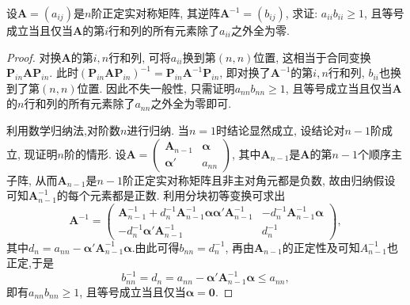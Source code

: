 \documentclass[../../main.tex]{subfiles}
\begin{document}
\begin{example}
设$\boldsymbol{A}=(a_{ij})$是$n$阶正定实对称矩阵, 其逆阵$\boldsymbol{A}^{-1}=(b_{ij})$, 求证: $a_{ii}b_{ii}\geqslant  1$, 且等号成立当且仅当$\boldsymbol{A}$的第$i$行和列的所有元素除了$a_{ii}$之外全为零.
\end{example}
\begin{proof}
对换$\boldsymbol{A}$的第$i,n$行和列, 可将$a_{ii}$换到第$(n,n)$位置, 这相当于合同变换$\boldsymbol{P}_{in}\boldsymbol{A}\boldsymbol{P}_{in}$. 此时$(\boldsymbol{P}_{in}\boldsymbol{A}\boldsymbol{P}_{in})^{-1}=\boldsymbol{P}_{in}\boldsymbol{A}^{-1}\boldsymbol{P}_{in}$, 即对换了$\boldsymbol{A}^{-1}$的第$i,n$行和列, $b_{ii}$也换到了第$(n,n)$位置. 因此不失一般性, 只需证明$a_{nn}b_{nn}\geqslant  1$, 且等号成立当且仅当$\boldsymbol{A}$的$n$行和列的所有元素除了$a_{nn}$之外全为零即可. 

利用数学归纳法,对阶数$n$进行归纳. 当$n = 1$时结论显然成立, 设结论对$n - 1$阶成立, 现证明$n$阶的情形. 设$\boldsymbol{A}=\begin{pmatrix}
\boldsymbol{A}_{n - 1} & \boldsymbol{\alpha} \\
\boldsymbol{\alpha}' & a_{nn}
\end{pmatrix}$, 其中$\boldsymbol{A}_{n - 1}$是$\boldsymbol{A}$的第$n - 1$个顺序主子阵, 从而$\boldsymbol{A}_{n - 1}$是$n - 1$阶正定实对称矩阵且非主对角元都是负数, 故由归纳假设可知$\boldsymbol{A}_{n - 1}^{-1}$的每个元素都是正数. 利用分块初等变换可求出
\[
\boldsymbol{A}^{-1}=\begin{pmatrix}
\boldsymbol{A}_{n - 1}^{-1}+d_n^{-1}\boldsymbol{A}_{n - 1}^{-1}\boldsymbol{\alpha}\boldsymbol{\alpha}'\boldsymbol{A}_{n - 1}^{-1} & -d_n^{-1}\boldsymbol{A}_{n - 1}^{-1}\boldsymbol{\alpha} \\
-d_n^{-1}\boldsymbol{\alpha}'\boldsymbol{A}_{n - 1}^{-1} & d_n^{-1}
\end{pmatrix},
\]
其中$d_n = a_{nn}-\boldsymbol{\alpha}'\boldsymbol{A}_{n - 1}^{-1}\boldsymbol{\alpha}$.由此可得$b_{nn}=d_n^{-1}$, 再由$\boldsymbol{A}_{n - 1}$的正定性及可知$A_{n-1}^{-1}$也正定,于是
\[
b_{nn}^{-1}=d_n=a_{nn}-\boldsymbol{\alpha}'\boldsymbol{A}_{n - 1}^{-1}\boldsymbol{\alpha}\leqslant  a_{nn},
\]
即有$a_{nn}b_{nn}\geqslant  1$, 且等号成立当且仅当$\boldsymbol{\alpha}=\boldsymbol{0}$. 
\end{proof}
\end{document}

